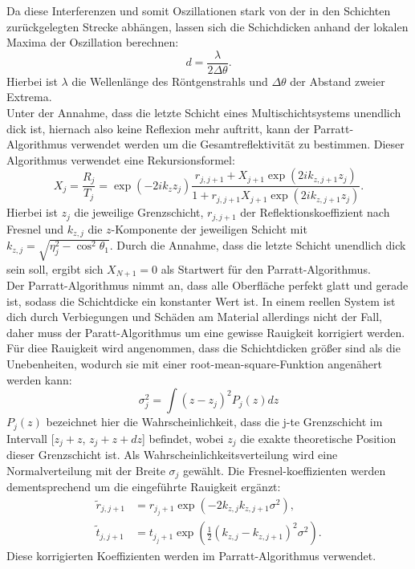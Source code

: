 Da diese Interferenzen und somit Oszillationen stark von der in den Schichten zurückgelegten Strecke abhängen, lassen sich die Schichdicken anhand der lokalen Maxima der Oszillation berechnen:
\begin{equation}
    d = \frac{\lambda}{2\Delta \theta}.
\end{equation}
Hierbei ist $\lambda$ die Wellenlänge des Röntgenstrahls und $\Delta \theta$ der Abstand zweier Extrema.\\
Unter der Annahme, dass die letzte Schicht eines Multischichtsystems unendlich dick ist, hiernach also keine Reflexion mehr auftritt, kann der Parratt-Algorithmus verwendet werden um die Gesamtreflektivität
zu bestimmen. Dieser Algorithmus verwendet eine Rekursionsformel:
\begin{equation}
    X_j = \frac{R_j}{T_j} = \exp{(-2ik_z  z_j)}\frac{r_{j,j+1}+X_{j+1}\exp{(2ik_{z,j+1}z_j)}}{1+r_{j,j+1}X_{j+1}\exp{(2ik_{z,j+1}z_j)}}.
\end{equation}
Hierbei ist $z_j$ die jeweilige Grenzschicht, $r_{j,j+1}$ der Reflektionskoeffizient nach Fresnel und $k_{z,j}$ die $z$-Komponente der jeweiligen Schicht mit $k_{z,j} = \sqrt{\eta_j^2 - \cos^2{\theta_1}}$. Durch
die Annahme, dass die letzte Schicht unendlich dick sein soll, ergibt sich $X_{N+1} =0$ als Startwert für den Parratt-Algorithmus.\\
Der Parratt-Algorithmus nimmt an, dass alle Oberfläche perfekt glatt und gerade ist, sodass die Schichtdicke ein konstanter Wert ist. In einem reellen System ist dich durch Verbiegungen und Schäden am Material allerdings
nicht der Fall, daher muss der Paratt-Algorithmus um eine gewisse Rauigkeit korrigiert werden. Für diee Rauigkeit wird angenommen, dass die Schichtdicken größer sind als die Unebenheiten, wodurch sie mit 
einer root-mean-square-Funktion angenähert werden kann:
\begin{equation}
    \sigma_j^2 = \int (z-z_j)^2P_j(z)dz
\end{equation}
$P_j(z)$ bezeichnet hier die Wahrscheinlichkeit, dass die j-te Grenzschicht im Intervall [$z_j+z$, $z_j+z+dz$] befindet, wobei $z_j$ die exakte theoretische Position dieser Grenzschicht ist. Als Wahrscheinlichkeitsverteilung
wird eine Normalverteilung mit der Breite $\sigma_j$ gewählt. Die Fresnel-koeffizienten werden dementsprechend um die eingeführte Rauigkeit ergänzt:
\begin{align}
    \tilde{r}_{j,j+1} &= r_{j_j+1} \exp{(-2k_{z,j}k_{z,j+1}\sigma^2)},\\
    \tilde{t}_{j,j+1} &=  t_{j_j+1} \exp{(\frac{1}{2}(k_{z,j}-k_{z,j+1})^2\sigma^2)}.
\end{align}
Diese korrigierten Koeffizienten werden im Parratt-Algorithmus verwendet.

